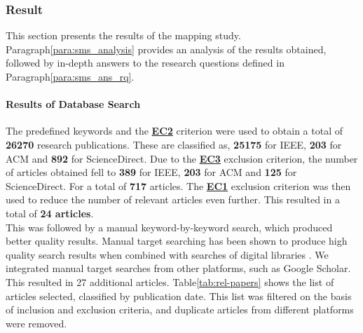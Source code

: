     
        \subsubsection{Result}
        This section presents the results of the mapping study. Paragraph\ref{para:sms_analysis} provides an analysis of the results obtained, followed by in-depth answers to the research questions defined in Paragraph\ref{para:sms_ans_rq}.

            \paragraph{Results of Database Search}
            The predefined keywords and the \hyperref[EC2]{\textbf{EC2}} criterion were used to obtain a total of \textbf{26270} research publications. These are classified as, \textbf{25175} for IEEE, \textbf{203} for ACM and \textbf{892} for ScienceDirect. Due to the \hyperref[EC3]{\textbf{EC3}} exclusion criterion, the number of articles obtained fell to \textbf{389} for IEEE, \textbf{203} for ACM and \textbf{125} for ScienceDirect. For a total of \textbf{717} articles. The \hyperref[EC1]{\textbf{EC1}} exclusion criterion was then used to reduce the number of relevant articles even further. This resulted in a total of \textbf{24 articles}.\\
            This was followed by a manual keyword-by-keyword search, which produced better quality results. Manual target searching has been shown to produce high quality search results when combined with searches of digital libraries \cite{petersen2008systematic}. We integrated manual target searches from other platforms, such as Google Scholar. This resulted in 27 additional articles. Table\ref{tab:rel-papers} shows the list of articles selected, classified by publication date. This list was filtered on the basis of inclusion and exclusion criteria, and duplicate articles from different platforms were removed.\\

